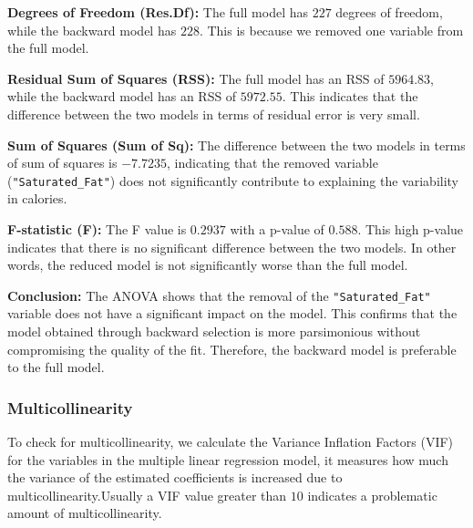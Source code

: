 \documentclass[
]{article}
\begin{document}
\textbf{Degrees of Freedom (Res.Df):} The full model has \(227\) degrees
of freedom, while the backward model has \(228\). This is because we
removed one variable from the full model.

\textbf{Residual Sum of Squares (RSS):} The full model has an RSS of
\(5964.83\), while the backward model has an RSS of \(5972.55\). This
indicates that the difference between the two models in terms of
residual error is very small.

\textbf{Sum of Squares (Sum of Sq):} The difference between the two
models in terms of sum of squares is \(-7.7235\), indicating that the
removed variable (\texttt{"Saturated\_Fat"}) does not significantly
contribute to explaining the variability in calories.

\textbf{F-statistic (F):} The F value is \(0.2937\) with a p-value of
\(0.588\). This high p-value indicates that there is no significant
difference between the two models. In other words, the reduced model is
not significantly worse than the full model.

\textbf{Conclusion:} The ANOVA shows that the removal of the
\texttt{"Saturated\_Fat"} variable does not have a significant impact on
the model. This confirms that the model obtained through backward
selection is more parsimonious without compromising the quality of the
fit. Therefore, the backward model is preferable to the full model.

\subsubsection{Multicollinearity}\label{multicollinearity}

To check for multicollinearity, we calculate the Variance Inflation
Factors (VIF) for the variables in the multiple linear regression model,
it measures how much the variance of the estimated coefficients is
increased due to multicollinearity.Usually a VIF value greater than
\(10\) indicates a problematic amount of multicollinearity.
\end{document}
